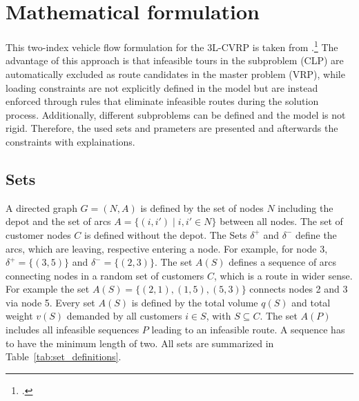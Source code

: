 \section{Mathematical formulation}
\label{sec:mathematical_formulation}

This two-index vehicle flow formulation for the \gls{3L-CVRP} is taken from \cite{tamke_branch-and-cut_2024}.\footcite[cf.][p. 6f]{tamke_branch-and-cut_2024}
The advantage of this approach is that infeasible tours in the subproblem (\gls{CLP}) are automatically excluded as route candidates
in the master problem (\gls{VRP}), while loading constraints are not explicitly defined in the model but are instead enforced through
rules that eliminate infeasible routes during the solution process. Additionally, different subproblems can be defined and the model is
not rigid. Therefore, the used sets and prameters are presented and afterwards the constraints with explainations.

\subsection*{Sets}
A directed graph $G=(N,A)$ is defined by the set of nodes $N$ including the depot and the set of arcs
$A = \{ (i, i') \mid i, i' \in N \}$ between all nodes. The set of customer nodes $C$ is defined without the depot.
The Sets $\delta^+$ and $\delta^-$ define the arcs, which are leaving, respective entering a node.
For example, for node 3, $\delta^+ = \{(3,5)\}$ and $\delta^-= \{(2,3)\}$.
The set $A(S)$ defines a sequence of arcs connecting nodes in a random set of customers $C$,
which is a route in wider sense. For example the set $A(S)=\{(2,1),(1,5),(5,3)\}$ connects nodes
2 and 3 via node 5. Every set $A(S)$ is defined by the total volume $q(S)$ and total weight $v(S)$
demanded by all customers $i \in S$, with $S \subseteq C$. The set $A(P)$ includes all infeasible sequences $P$ leading
to an infeasible route. A sequence has to have the minimum length of two. All sets are summarized in Table~\ref{tab:set_definitions}.

